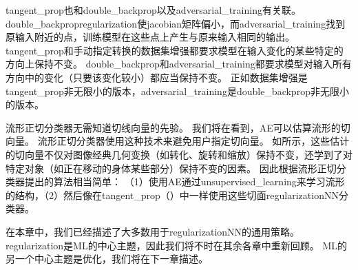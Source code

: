
\gls{tangent_prop}也和\gls{double_backprop}\citep{DruckerLeCun92}以及\gls{adversarial_training}\citep{Szegedy-ICLR2014,Goodfellow-2015-adversarial}有关联。
\gls{double_backprop}\gls{regularization}使\gls{jacobian}矩阵偏小，而\gls{adversarial_training}找到原输入附近的点，训练模型在这些点上产生与原来输入相同的输出。
\gls{tangent_prop}和手动指定转换的数据集增强都要求模型在输入变化的某些特定的方向上保持不变。
\gls{double_backprop}和\gls{adversarial_training}都要求模型对输入所有方向中的变化（只要该变化较小）都应当保持不变。
正如数据集增强是\gls{tangent_prop}非无限小的版本，\gls{adversarial_training}是\gls{double_backprop}非无限小的版本。

流形正切分类器\citep{Dauphin-et-al-NIPS2011}无需知道切线向量的先验。
我们将在看到，\gls{AE}可以估算流形的切向量。
流形正切分类器使用这种技术来避免用户指定切向量。
如所示，这些估计的切向量不仅对图像经典几何变换（如转化、旋转和缩放）保持不变，还学到了对特定对象（如正在移动的身体某些部分）保持不变的因素。
因此根据流形正切分类器提出的算法相当简单：
（1）使用\gls{AE}通过\gls{unsupervised_learning}来学习流形的结构，（2）然后像在\gls{tangent_prop}（）中一样使用这些切面\gls{regularization}\gls{NN}分类器。

在本章中，我们已经描述了大多数用于\gls{regularization}\gls{NN}的通用策略。
\gls{regularization}是\gls{ML}的中心主题，因此我们将不时在其余各章中重新回顾。
\gls{ML}的另一个中心主题是优化，我们将在下一章描述。


